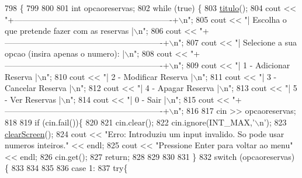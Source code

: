 \begin{DoxyCode}
798                            \{
799 
800 
801     \textcolor{keywordtype}{int} opcaoreservas;
802     \textcolor{keywordflow}{while} (\textcolor{keyword}{true}) \{
803         \hyperlink{classEmpresa_ad79f7196a8ce7256771cbd7b9542155c}{titulo}();
804         cout << \textcolor{stringliteral}{"+----------------------------------------------------------+\(\backslash\)n"};
805         cout << \textcolor{stringliteral}{"| Escolha o que pretende fazer com as reservas             |\(\backslash\)n"};
806         cout << \textcolor{stringliteral}{"+----------------------------------------------------------+\(\backslash\)n"};
807         cout << \textcolor{stringliteral}{"| Selecione a sua opcao (insira apenas o numero):          |\(\backslash\)n"};
808         cout << \textcolor{stringliteral}{"+----------------------------------------------------------+\(\backslash\)n"};
809         cout << \textcolor{stringliteral}{"| 1 - Adicionar Reserva                                    |\(\backslash\)n"};
810         cout << \textcolor{stringliteral}{"| 2 - Modificar Reserva                                    |\(\backslash\)n"};
811         cout << \textcolor{stringliteral}{"| 3 - Cancelar Reserva                                     |\(\backslash\)n"};
812         cout << \textcolor{stringliteral}{"| 4 - Apagar Reserva                                       |\(\backslash\)n"};
813         cout << \textcolor{stringliteral}{"| 5 - Ver Reservas                                         |\(\backslash\)n"};
814         cout << \textcolor{stringliteral}{"| 0 - Sair                                                 |\(\backslash\)n"};
815         cout << \textcolor{stringliteral}{"+----------------------------------------------------------+\(\backslash\)n"};
816 
817         cin >> opcaoreservas;
818 
819         \textcolor{keywordflow}{if} (cin.fail())\{
820 
821             cin.clear();
822             cin.ignore(INT\_MAX,\textcolor{charliteral}{'\(\backslash\)n'});
823             \hyperlink{menu_8h_aceb70c1ed7e11f0863a868704f02214b}{clearScreen}();
824             cout << \textcolor{stringliteral}{"Erro: Introduziu um input invalido. So pode usar numeros inteiros."} << endl;
825             cout << \textcolor{stringliteral}{"Pressione Enter para voltar ao menu"} << endl;
826             cin.get();
827             \textcolor{keywordflow}{return};
828 
829 
830 
831                 \}
832         \textcolor{keywordflow}{switch} (opcaoreservas) \{
833 
834         
835 
836         \textcolor{keywordflow}{case} 1:
837             \textcolor{keywordflow}{try}\{

\end{DoxyCode}

